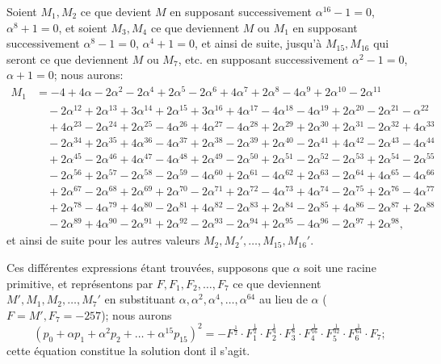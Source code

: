 \documentclass[11pt,a4paper]{book}
\begin{document}
Soient $M_1, M_2$ ce que devient $M$ en supposant successivement $\alpha^{16} - 1 = 0$, $\alpha^8 + 1 = 0$, et soient $M_3, M_4$ ce que deviennent $M$ ou $M_1$ en supposant successivement $\alpha^8 - 1 = 0$, $\alpha^4 + 1 = 0$, et ainsi de suite, jusqu'\`{a} $M_{15}, M_{16}$ qui seront ce que deviennent $M$ ou $M_7$, etc. en supposant successivement $\alpha^2 - 1 = 0$, $\alpha + 1 = 0$; nous aurons:
\begin{align*}
M_1 &= -4 + 4\alpha - 2\alpha^2 - 2\alpha^4 + 2\alpha^5 - 2\alpha^6 + 4\alpha^7 + 2\alpha^8 - 4\alpha^9 + 2\alpha^{10} - 2\alpha^{11} \\
&\quad - 2\alpha^{12} + 2\alpha^{13} + 3\alpha^{14} + 2\alpha^{15} + 3\alpha^{16} + 4\alpha^{17} - 4\alpha^{18} - 4\alpha^{19} + 2\alpha^{20} - 2\alpha^{21} - \alpha^{22} \\
&\quad + 4\alpha^{23} - 2\alpha^{24} + 2\alpha^{25} - 4\alpha^{26} + 4\alpha^{27} - 4\alpha^{28} + 2\alpha^{29} + 2\alpha^{30} + 2\alpha^{31} - 2\alpha^{32} + 4\alpha^{33} \\
&\quad - 2\alpha^{34} + 2\alpha^{35} + 4\alpha^{36} - 4\alpha^{37} + 2\alpha^{38} - 2\alpha^{39} + 2\alpha^{40} - 2\alpha^{41} + 4\alpha^{42} - 2\alpha^{43} - 4\alpha^{44} \\
&\quad + 2\alpha^{45} - 2\alpha^{46} + 4\alpha^{47} - 4\alpha^{48} + 2\alpha^{49} - 2\alpha^{50} + 2\alpha^{51} - 2\alpha^{52} - 2\alpha^{53} + 2\alpha^{54} - 2\alpha^{55} \\
&\quad - 2\alpha^{56} + 2\alpha^{57} - 2\alpha^{58} - 2\alpha^{59} - 4\alpha^{60} + 2\alpha^{61} - 4\alpha^{62} + 2\alpha^{63} - 2\alpha^{64} + 4\alpha^{65} - 4\alpha^{66} \\
&\quad + 2\alpha^{67} - 2\alpha^{68} + 2\alpha^{69} + 2\alpha^{70} - 2\alpha^{71} + 2\alpha^{72} - 4\alpha^{73} + 4\alpha^{74} - 2\alpha^{75} + 2\alpha^{76} - 4\alpha^{77} \\
&\quad + 2\alpha^{78} - 4\alpha^{79} + 4\alpha^{80} - 2\alpha^{81} + 4\alpha^{82} - 2\alpha^{83} + 2\alpha^{84} - 2\alpha^{85} + 4\alpha^{86} - 2\alpha^{87} + 2\alpha^{88} \\
&\quad - 2\alpha^{89} + 4\alpha^{90} - 2\alpha^{91} + 2\alpha^{92} - 2\alpha^{93} - 2\alpha^{94} + 2\alpha^{95} - 4\alpha^{96} - 2\alpha^{97} + 2\alpha^{98},
\end{align*}
et ainsi de suite pour les autres valeurs $M_2, M_2', \ldots, M_{15}, M_{16}'$.

Ces diff\'{e}rentes expressions \'{e}tant trouv\'{e}es, supposons que $\alpha$ soit une racine primitive, et repr\'{e}sentons par $F, F_1, F_2, \ldots, F_7$ ce que deviennent $M', M_1, M_2, \ldots, M_7'$ en substituant $\alpha, \alpha^2, \alpha^4, \ldots, \alpha^{64}$ au lieu de $\alpha$ ($F = M', F_7 = -257$); nous aurons
\[
(p_0 + \alpha p_1 + \alpha^2 p_2 + \ldots + \alpha^{15} p_{15})^2 = -F^{\frac{1}{2}} \cdot F_1^{\frac{1}{2}} \cdot F_2^{\frac{1}{4}} \cdot F_3^{\frac{1}{8}} \cdot F_4^{\frac{1}{16}} \cdot F_5^{\frac{1}{32}} \cdot F_6^{\frac{1}{64}} \cdot F_7;
\]
cette \'{e}quation constitue la solution dont il s'agit.
\end{document}
